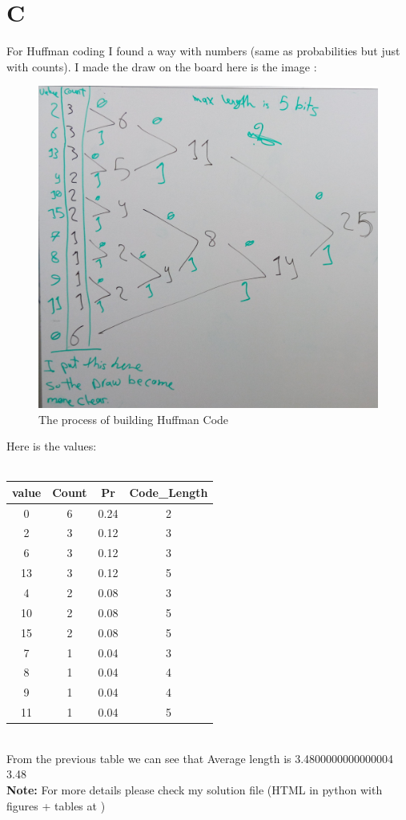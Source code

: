 \documentclass{article}
\begin{document}
 \section *{C}
For Huffman coding I found a way with numbers (same as probabilities but just with counts). I made the draw on the board here is the image :
\begin{figure}[H]
\includegraphics[scale=0.2]{c_modified.jpg}
\caption{The process of building Huffman Code}
\end{figure}
Here is the values:\\ \\ 
\begin{tabular}{|c|c|c|c|}
\hline
value&Count&Pr&Code\_Length\\ \hline 
0&6&0.24&2\\ \hline 
2&3&0.12&3\\ \hline 
6&3&0.12&3\\ \hline 
13&3&0.12&5\\ \hline 
4&2&0.08&3\\ \hline 
10&2&0.08&5\\ \hline 
15&2&0.08&5\\ \hline 
7&1&0.04&3\\ \hline 
8&1&0.04&4\\ \hline 
9&1&0.04&4\\ \hline 
11&1&0.04&5\\ \hline
\end{tabular} \\

From the previous table we can see that Average length is 3.4800000000000004~ 3.48\\
\textbf{Note:} For more details please check my solution file (HTML in python with figures + tables at )
\end{document}
